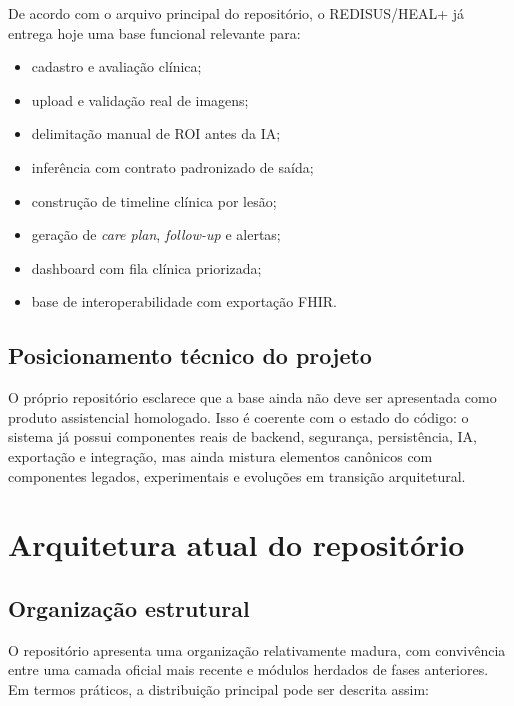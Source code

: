\documentclass[
    12pt,
    openright,
    oneside,
    a4paper,
    chapter=TITLE,
    section=TITLE,
    brazil,
    sumario=tradicional,
    hidelinks
]{abntex2}
\begin{document}
De acordo com o arquivo principal do reposit\'orio, o REDISUS/HEAL+ j\'a entrega hoje uma base funcional relevante para:

\begin{itemize}
    \item cadastro e avalia\c{c}\~ao cl\'inica;
    \item upload e valida\c{c}\~ao real de imagens;
    \item delimita\c{c}\~ao manual de ROI antes da IA;
    \item infer\^encia com contrato padronizado de sa\'ida;
    \item constru\c{c}\~ao de timeline cl\'inica por les\~ao;
    \item gera\c{c}\~ao de \textit{care plan}, \textit{follow-up} e alertas;
    \item dashboard com fila cl\'inica priorizada;
    \item base de interoperabilidade com exporta\c{c}\~ao FHIR.
\end{itemize}

\section{Posicionamento t\'ecnico do projeto}

O pr\'oprio reposit\'orio esclarece que a base ainda n\~ao deve ser apresentada como produto assistencial homologado. Isso \'e coerente com o estado do c\'odigo: o sistema j\'a possui componentes reais de backend, seguran\c{c}a, persist\^encia, IA, exporta\c{c}\~ao e integra\c{c}\~ao, mas ainda mistura elementos can\^onicos com componentes legados, experimentais e evolu\c{c}\~oes em transi\c{c}\~ao arquitetural.

\chapter{Arquitetura atual do reposit\'orio}

\section{Organiza\c{c}\~ao estrutural}

O reposit\'orio apresenta uma organiza\c{c}\~ao relativamente madura, com conviv\^encia entre uma camada oficial mais recente e m\'odulos herdados de fases anteriores. Em termos pr\'aticos, a distribui\c{c}\~ao principal pode ser descrita assim:
\end{document}
